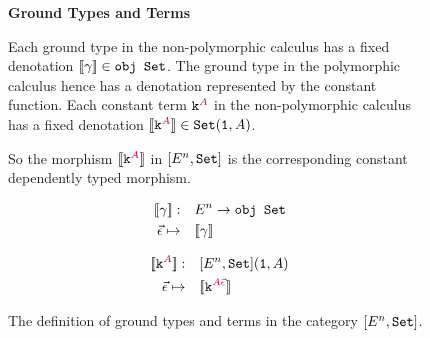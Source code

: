 \begin{figure}
    \begin{framed}
        \centering\textbf{Ground Types and Terms}

        Each ground type in the non-polymorphic calculus has a fixed denotation ${\bf [\![}\gamma{\bf ]\!]}\in\texttt{obj }\texttt{Set}$. The ground type in the polymorphic calculus hence has a denotation represented by the constant function. Each constant term $\texttt{k}^{\color{purple} A}$ in the non-polymorphic calculus has a fixed denotation ${\bf [\![}\texttt{k}^{\color{purple} A}{\bf ]\!]}\in\texttt{Set}(\texttt{1}, A)$.
        
        So the morphism ${\bf [\![}\texttt{k}^{\color{purple} A}{\bf ]\!]}$ in $[E^n, \texttt{Set}]$ is the corresponding constant dependently typed morphism.
        
        \begin{minipage}
            {0.45\linewidth}
            \begin{align*}
                {\bf [\![}\gamma{\bf ]\!]}:&\quad E^n\rightarrow \texttt{obj }\texttt{Set}\\
                \vec{\epsilon} \mapsto&\quad  {\bf [\![}\gamma{\bf ]\!]}\\
            \end{align*}
            
        \end{minipage}\quad
        \begin{minipage}
            {0.45\linewidth}
            \begin{align*}
                {\bf [\![}\texttt{k}^{\color{purple} A}{\bf ]\!]}:&\quad[E^n, \texttt{Set}](\texttt{1}, A)\\
                \vec{\epsilon}\mapsto&\quad{\bf [\![}\texttt{k}^{\color{purple} A\vec{\epsilon}}{\bf ]\!]}
            \end{align*}   
        \end{minipage}            
    \end{framed}

    \caption{The definition of ground types and terms in the category $[E^n, \texttt{Set}]$.}
    \label{HowToBuildGround}
\end{figure}


